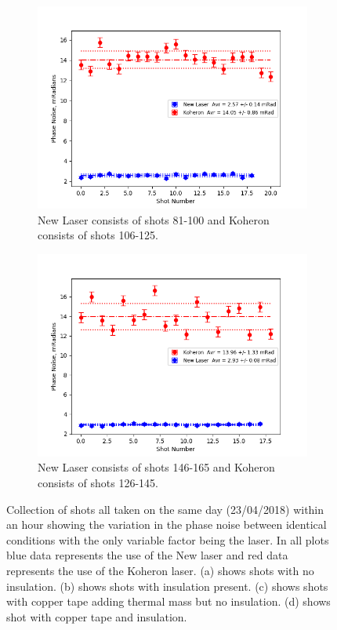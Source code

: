 \documentclass[12pt,a4paper,oneside]{report}
\begin{document}
\begin{figure}[H]
\begin{subfigure}{.5\textwidth}
\centering\captionsetup{width=.9\linewidth}
\includegraphics[width=\textwidth,angle=0]{DImages/Phase_Noise_for_Shots_5and_6.png}
\caption{New Laser consists of shots 81-100 and Koheron consists of shots 106-125.}
\end{subfigure}
\begin{subfigure}{.5\textwidth}
\centering\captionsetup{width=.9\linewidth}
\includegraphics[width=\textwidth, angle=0]{DImages/Phase_Noise_for_Shots_7and_8.png}
\caption{New Laser consists of shots 146-165 and Koheron consists of shots 126-145.}
\end{subfigure}
\caption{Collection of shots all taken on the same day (23/04/2018) within an hour showing the variation in the phase noise between identical conditions with the only variable factor being the laser. In all plots blue data represents the use of the New laser and red data represents the use of the Koheron laser. (a) shows shots with no insulation. (b) shows shots with insulation present. (c) shows shots with copper tape adding thermal mass but no insulation. (d) shows shot with copper tape and insulation.}
\label{fig:4-phase-noise}
\end{figure}
\end{document}
